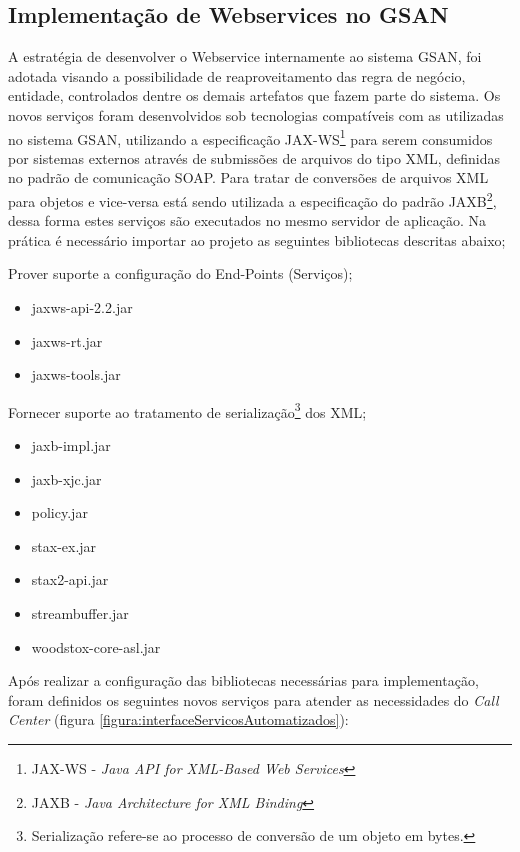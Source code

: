 \subsection{Implementação de Webservices no GSAN}

A estratégia de desenvolver o Webservice internamente ao sistema GSAN, foi adotada visando a possibilidade de reaproveitamento das regra de negócio, entidade, controlados dentre os demais artefatos que fazem parte do sistema.  Os novos serviços foram desenvolvidos sob tecnologias compatíveis com as utilizadas no sistema GSAN, utilizando a especificação JAX-WS\footnote{JAX-WS - \textit{Java API for XML-Based Web Services}}  para serem consumidos por sistemas externos através de submissões de arquivos do tipo XML, definidas no padrão de comunicação SOAP. Para tratar de conversões de arquivos XML para objetos e vice-versa está sendo utilizada a especificação do padrão JAXB\footnote{JAXB - \textit{Java Architecture for XML Binding}}, dessa forma estes serviços são executados no mesmo servidor de aplicação.
Na prática é necessário importar ao projeto as seguintes bibliotecas descritas abaixo;

 Prover suporte a configuração do End-Points (Serviços);
	\begin{itemize}
		\item jaxws-api-2.2.jar
		\item jaxws-rt.jar
		\item jaxws-tools.jar		
	\end{itemize}
	Fornecer suporte ao tratamento de serialização\footnote{Serialização refere-se ao processo de conversão de um objeto em bytes.} dos XML;
	\begin{itemize}
		\item jaxb-impl.jar
		\item jaxb-xjc.jar
		\item policy.jar
		\item stax-ex.jar
		\item stax2-api.jar
		\item streambuffer.jar
		\item woodstox-core-asl.jar		
	\end{itemize}


Após realizar a configuração das bibliotecas necessárias para implementação, foram definidos os seguintes novos serviços para atender as necessidades do \textit{Call Center} (figura \ref{figura:interfaceServicosAutomatizados}):

